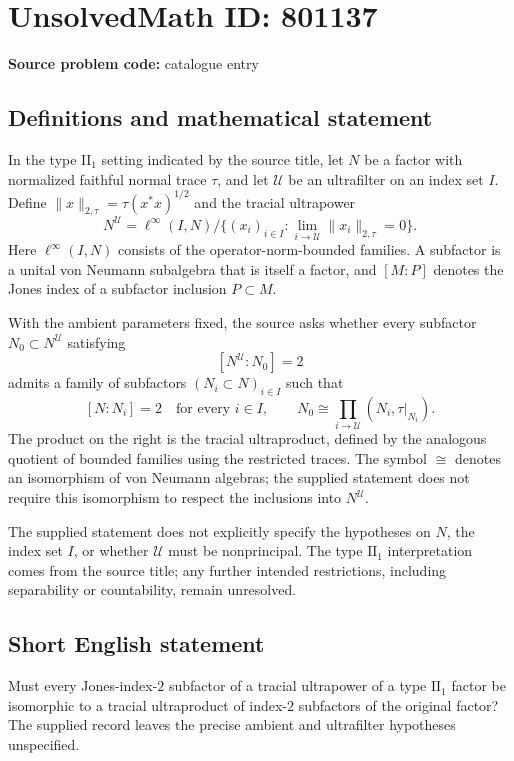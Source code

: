 \documentclass[11pt]{article}
\begin{document}
\section*{UnsolvedMath ID: 801137}
\textbf{Source problem code:} catalogue entry
\subsection{Definitions and mathematical statement}
In the type \(\mathrm{II}_1\) setting indicated by the source title, let \(N\) be a factor with normalized faithful normal trace \(\tau\), and let \(\mathcal U\) be an ultrafilter on an index set \(I\). Define \(\|x\|_{2,\tau}=\tau(x^*x)^{1/2}\) and the tracial ultrapower
\[
N^{\mathcal U}=\ell^\infty(I,N)\big/\{(x_i)_{i\in I}:\lim_{i\to\mathcal U}\|x_i\|_{2,\tau}=0\}.
\]
Here \(\ell^\infty(I,N)\) consists of the operator-norm-bounded families. A subfactor is a unital von Neumann subalgebra that is itself a factor, and \([M:P]\) denotes the Jones index of a subfactor inclusion \(P\subset M\).

With the ambient parameters fixed, the source asks whether every subfactor \(N_0\subset N^{\mathcal U}\) satisfying
\[
[N^{\mathcal U}:N_0]=2
\]
admits a family of subfactors \((N_i\subset N)_{i\in I}\) such that
\[
[N:N_i]=2\quad\text{for every }i\in I,
\qquad
N_0\cong\prod_{i\to\mathcal U}(N_i,\tau|_{N_i}).
\]
The product on the right is the tracial ultraproduct, defined by the analogous quotient of bounded families using the restricted traces. The symbol \(\cong\) denotes an isomorphism of von Neumann algebras; the supplied statement does not require this isomorphism to respect the inclusions into \(N^{\mathcal U}\).

The supplied statement does not explicitly specify the hypotheses on \(N\), the index set \(I\), or whether \(\mathcal U\) must be nonprincipal. The type \(\mathrm{II}_1\) interpretation comes from the source title; any further intended restrictions, including separability or countability, remain unresolved.
\subsection{Short English statement}
Must every Jones-index-\(2\) subfactor of a tracial ultrapower of a type \(\mathrm{II}_1\) factor be isomorphic to a tracial ultraproduct of index-\(2\) subfactors of the original factor? The supplied record leaves the precise ambient and ultrafilter hypotheses unspecified.
\end{document}
